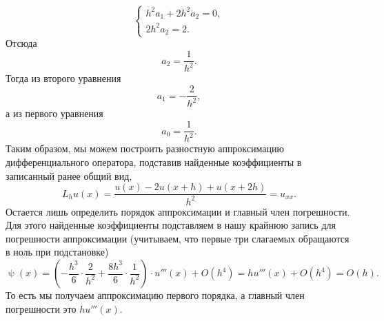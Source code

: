 \documentclass[a4paper, 12pt]{article}
\renewcommand{\psi}{\uppsi}
\begin{document}
\begin{enumerate}
$$\begin{cases}
			h^2 a_1+ 2 h^2 a_2= 0,\\
			2h^2a_2 = 2.
		\end{cases}$$
		Отсюда $$a_2 = \dfrac{1}{h^2}.$$
		Тогда из второго уравнения $$a_1 = -\dfrac{2}{h^2},$$ а из первого уравнения $$a_0 = \dfrac{1}{h^2}.$$
		Таким образом, мы можем построить разностную аппроксимацию дифференциального оператора, подставив найденные коэффициенты в записанный ранее общий вид,
		$$L_h u(x) = \dfrac{u(x)  -2 u(x+h) +  u(x+2h)}{h^2}=u_{x x}.$$ 
		Остается лишь определить порядок аппроксимации и главный член погрешности. Для этого найденные коэффициенты подставляем в нашу крайнюю запись для погрешности аппроксимации (учитываем, что первые три слагаемых обращаются в ноль при подстановке)
		$$
		\psi(x) = \left(-\dfrac{h^3}{6}\cdot \dfrac{2}{h^2} +\dfrac{8h^3}{6} \cdot \dfrac{1}{h^2}\right)\cdot u'''(x) +O(h^4) = h u'''(x) + O(h^4) = O(h).
		$$
		То есть мы получаем аппроксимацию первого порядка, а главный член погрешности это $hu'''(x)$.
		

\end{enumerate}
\end{document}
